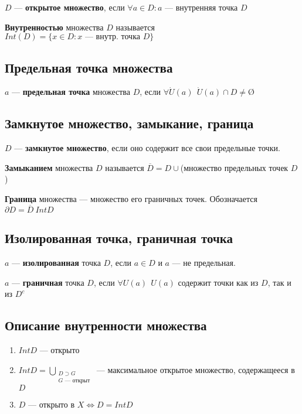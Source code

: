 $D$ --- {\bf открытое множество}, если $\forall a\in D : a$ --- внутренняя точка $D$

{\bf Внутренностью} множества $D$ называется $Int(D)=\{x\in D : x \text{ --- внутр. точка }D\}$

\subsection{Предельная точка множества}

$a$ --- {\bf предельная точка} множества $D$, если $\forall \dot U(a) \ \ \dot U(a)\cap D\not = \text{\O}$

\subsection{Замкнутое множество, замыкание, граница}

$D$ --- {\bf замкнутое множество}, если оно содержит все свои предельные точки.

{\bf Замыканием} множества $D$ называется $\overline D=D\cup$(множество предельных точек $D$)

{\bf Граница} множества --- множество его граничных точек. Обозначается $\partial D=\overline D\ Int D$

\subsection{Изолированная точка, граничная точка}

$a$ --- {\bf изолированная} точка $D$, если $a\in D$ и $a$ --- не предельная.

$a$ --- {\bf граничная} точка $D$, если $\forall U(a) \ \ U(a)$ содержит точки как из $D$, так и из $D^c$

\subsection{Описание внутренности множества}

\begin{enumerate}
    \item $Int D$ --- открыто
    \item $Int D = \bigcup\limits_{\substack{D\supset G \\ G\text{ --- открыт}}}$ --- максимальное открытое множество, содержащееся в $D$
    \item $D$ --- открыто в $X \Leftrightarrow D=Int D$
\end{enumerate}

